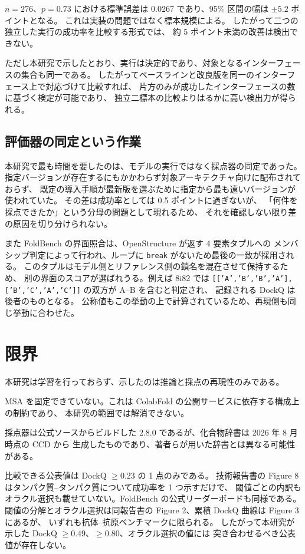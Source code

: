 \documentclass[11pt,a4paper]{article}
\begin{document}
$n = 276$、$p = 0.73$ における標準誤差は 0.0267 であり、95\% 区間の幅は $\pm 5.2$ ポイントとなる。
これは実装の問題ではなく標本規模による。
したがって二つの独立した実行の成功率を比較する形式では、
約 5 ポイント未満の改善は検出できない。

ただし本研究で示したとおり、実行は決定的であり、対象となるインターフェースの集合も同一である。
したがってベースラインと改良版を同一のインターフェース上で対応づけて比較すれば、
片方のみが成功したインターフェースの数に基づく検定が可能であり、
独立二標本の比較よりはるかに高い検出力が得られる。

\subsection{評価器の同定という作業}

本研究で最も時間を要したのは、モデルの実行ではなく採点器の同定であった。
指定バージョンが存在するにもかかわらず対象アーキテクチャ向けに配布されておらず、
既定の導入手順が最新版を選ぶために指定から最も遠いバージョンが使われていた。
その差は成功率としては 0.5 ポイントに過ぎないが、
「何件を採点できたか」という分母の問題として現れるため、
それを確認しない限り差の原因を切り分けられない。

また FoldBench の界面照合は、OpenStructure が返す 4 要素タプルへの
メンバシップ判定によって行われ、ループに \texttt{break} がないため最後の一致が採用される。
このタプルはモデル側とリファレンス側の鎖名を混在させて保持するため、
別の界面のスコアが選ばれうる。例えば 8i82 では
\texttt{[['A','B','B','A'], ['B','C','A','C']]} の双方が A--B を含むと判定され、
記録される DockQ は後者のものとなる。
公称値もこの挙動の上で計算されているため、再現側も同じ挙動に合わせた。

\section{限界}

本研究は学習を行っておらず、示したのは推論と採点の再現性のみである。

MSA を固定できていない。これは ColabFold の公開サービスに依存する構成上の制約であり、
本研究の範囲では解消できない。

採点器は公式ソースからビルドした 2.8.0 であるが、化合物辞書は 2026 年 8 月時点の CCD から
生成したものであり、著者らが用いた辞書とは異なる可能性がある。

比較できる公表値は DockQ $\geq 0.23$ の 1 点のみである。
技術報告書の Figure 8 はタンパク質--タンパク質について成功率を 1 つ示すだけで、
閾値ごとの内訳もオラクル選択も載せていない。FoldBench の公式リーダーボードも同様である。
閾値の分解とオラクル選択は同報告書の Figure 2、累積 DockQ 曲線は Figure 3 にあるが、
いずれも抗体--抗原ベンチマークに限られる。
したがって本研究が示した DockQ $\geq 0.49$、$\geq 0.80$、オラクル選択の値には
突き合わせるべき公表値が存在しない。
\end{document}
